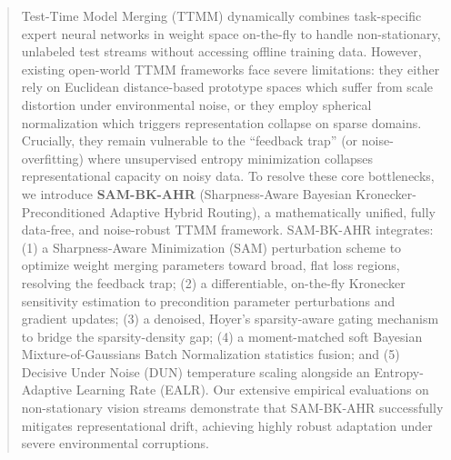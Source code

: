 \documentclass{article}
\theoremstyle{plain}
\theoremstyle{definition}
\theoremstyle{remark}
\begin{document}

\printAffiliationsAndNotice{}

\begin{abstract}
Test-Time Model Merging (TTMM) dynamically combines task-specific expert neural networks in weight space on-the-fly to handle non-stationary, unlabeled test streams without accessing offline training data. However, existing open-world TTMM frameworks face severe limitations: they either rely on Euclidean distance-based prototype spaces which suffer from scale distortion under environmental noise, or they employ spherical normalization which triggers representation collapse on sparse domains. Crucially, they remain vulnerable to the ``feedback trap'' (or noise-overfitting) where unsupervised entropy minimization collapses representational capacity on noisy data. To resolve these core bottlenecks, we introduce \textbf{SAM-BK-AHR} (Sharpness-Aware Bayesian Kronecker-Preconditioned Adaptive Hybrid Routing), a mathematically unified, fully data-free, and noise-robust TTMM framework. SAM-BK-AHR integrates: (1) a Sharpness-Aware Minimization (SAM) perturbation scheme to optimize weight merging parameters toward broad, flat loss regions, resolving the feedback trap; (2) a differentiable, on-the-fly Kronecker sensitivity estimation to precondition parameter perturbations and gradient updates; (3) a denoised, Hoyer's sparsity-aware gating mechanism to bridge the sparsity-density gap; (4) a moment-matched soft Bayesian Mixture-of-Gaussians Batch Normalization statistics fusion; and (5) Decisive Under Noise (DUN) temperature scaling alongside an Entropy-Adaptive Learning Rate (EALR). Our extensive empirical evaluations on non-stationary vision streams demonstrate that SAM-BK-AHR successfully mitigates representational drift, achieving highly robust adaptation under severe environmental corruptions.
\end{abstract}
\end{document}
